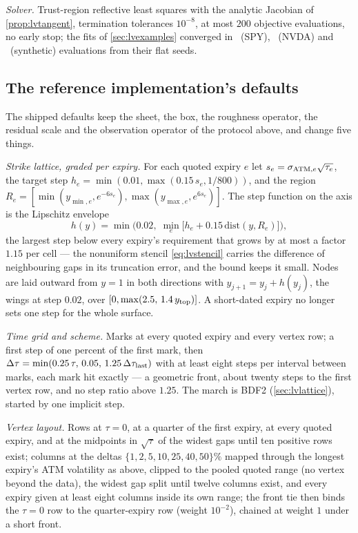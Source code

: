 \emph{Solver.}  Trust-region reflective least squares
\citep{BranchColemanLi1999} with the analytic Jacobian of
\cref{prop:lvtangent}, termination tolerances $10^{-8}$, at most $200$
objective evaluations, no early stop; the fits of \cref{sec:lvexamples} converged in
\MacLvSpyEvals\ (SPY), \MacLvNvdaEvals\ (NVDA) and \MacLvRtEvals\
(synthetic) evaluations from their flat seeds.

\subsection{The reference implementation's defaults}
\label{app:lvdefaults}

The shipped defaults keep the sheet, the box, the roughness operator,
the residual scale and the observation operator of the protocol
above, and change five things.

\emph{Strike lattice, graded per expiry.}  For each quoted expiry $e$
let $s_e=\sigma_{{\rm ATM},e}\sqrt{\tau_e}$, the target step
$h_e=\min(0.01,\max(0.15\,s_e,1/800))$, and the region
$R_e=[\min(y_{\min,e},e^{-6s_e}),\max(y_{\max,e},e^{6s_e})]$.  The
step function on the axis is the Lipschitz envelope
\[
h(y)=\min\Big(0.02,\;\min_e\big[h_e+0.15\,\mathrm{dist}(y,R_e)\big]\Big),
\]
the largest step below every expiry's requirement that grows by at
most a factor $1.15$ per cell --- the nonuniform stencil
\eqref{eq:lvstencil} carries the difference of neighbouring gaps in
its truncation error, and the bound keeps it small.  Nodes are laid
outward from $y=1$ in both directions with $y_{j+1}=y_j+h(y_j)$, the
wings at step $0.02$, over $[0,\max(2.5,\,1.4\,y_{\rm top})]$.  A
short-dated expiry no longer sets one step for the whole surface.

\emph{Time grid and scheme.}  Marks at every quoted expiry and every
vertex row; a first step of one percent of the first mark, then
$\Delta\tau=\min(0.25\,\tau,\,0.05,\,1.25\,\Delta\tau_{\rm last})$
with at least eight steps per interval between marks, each mark hit
exactly --- a geometric front, about twenty steps to the first
vertex row, and no step ratio above $1.25$.  The march is BDF2
(\cref{sec:lvlattice}), started by one implicit step.

\emph{Vertex layout.}  Rows at $\tau=0$, at a quarter of the first
expiry, at every quoted expiry, and at the midpoints in $\sqrt\tau$ of
the widest gaps until ten positive rows exist; columns at the deltas
$\{1,2,5,10,25,40,50\}\%$ mapped through the longest expiry's ATM
volatility as above, clipped to the pooled quoted range (no vertex
beyond the data), the widest gap split until twelve columns exist,
and every expiry given at least eight columns inside its own range;
the front tie then binds the $\tau=0$ row to the quarter-expiry row
(weight $10^{-2}$), chained at weight $1$ under a short front.

